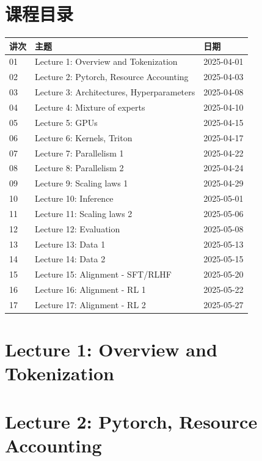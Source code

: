 \documentclass[a4paper]{article}
\begin{document}
\section*{课程目录}
\begin{longtable}{p{}p{}p{}}
\textbf{讲次} & \textbf{主题} & \textbf{日期}\\
\hline
01 & Lecture 1: Overview and Tokenization & 2025-04-01\\
02 & Lecture 2: Pytorch, Resource Accounting & 2025-04-03\\
03 & Lecture 3: Architectures, Hyperparameters & 2025-04-08\\
04 & Lecture 4: Mixture of experts & 2025-04-10\\
05 & Lecture 5: GPUs & 2025-04-15\\
06 & Lecture 6: Kernels, Triton & 2025-04-17\\
07 & Lecture 7: Parallelism 1 & 2025-04-22\\
08 & Lecture 8: Parallelism 2 & 2025-04-24\\
09 & Lecture 9: Scaling laws 1 & 2025-04-29\\
10 & Lecture 10: Inference & 2025-05-01\\
11 & Lecture 11: Scaling laws 2 & 2025-05-06\\
12 & Lecture 12: Evaluation & 2025-05-08\\
13 & Lecture 13: Data 1 & 2025-05-13\\
14 & Lecture 14: Data 2 & 2025-05-15\\
15 & Lecture 15: Alignment - SFT/RLHF & 2025-05-20\\
16 & Lecture 16: Alignment - RL 1 & 2025-05-22\\
17 & Lecture 17: Alignment - RL 2 & 2025-05-27\\
\end{longtable}

\section{Lecture 1: Overview and Tokenization}


\section{Lecture 2: Pytorch, Resource Accounting}

\end{document}
